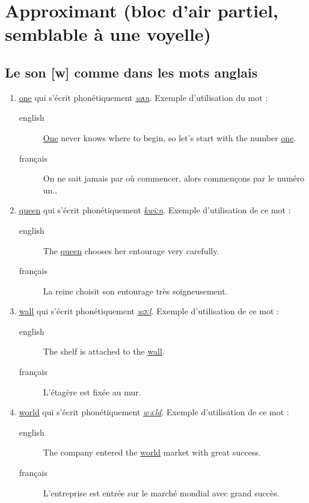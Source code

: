 \section{Approximant (bloc d'air partiel, semblable à une voyelle)}
\label{sec:org222f673}
\subsection{Le son [w] comme dans les mots anglais}
\label{sec:org6303a28}
\begin{enumerate}
\item \href{http://www.wordreference.com/enfr/one}{one} qui s'écrit phonétiquement \href{https://en.oxforddictionaries.com/definition/one}{\emph{wʌn}}. Exemple d'utilisation du
mot : 
\begin{description}
\item[{english}] \textenglish{\href{https://youtu.be/aSNJ00iAZ7I}{One} never knows where to begin, so let's start with
the number \href{https://youtu.be/jHRXlK2SnQ8}{one}.}
\item[{français}] On ne sait jamais par où commencer, alors commençons
par le numéro un..
\end{description}
\item \href{http://www.wordreference.com/enfr/queen}{queen} qui s'écrit phonétiquement \href{https://en.oxforddictionaries.com/definition/queen}{\emph{kwiːn}}. Exemple d'utilisation de
ce mot :
\begin{description}
\item[{english}] \textenglish{The \href{https://youtu.be/Jmd4OLzhQw0}{queen} chooses her entourage very carefully.}
\item[{français}] La reine choisit son entourage très soigneusement.
\end{description}
\item \href{http://www.wordreference.com/enfr/wall}{wall} qui s'écrit phonétiquement \href{https://en.oxforddictionaries.com/definition/wall}{\emph{wɔːl}}. Exemple d'utilisation de ce
mot : 
\begin{description}
\item[{english}] \textenglish{The shelf is attached to the \href{https://youtu.be/BN5Z28Dfl7o}{wall}.}
\item[{français}] L'étagère est fixée au mur.
\end{description}
\item \href{http://www.wordreference.com/enfr/world}{world} qui s'écrit phonétiquement \href{https://en.oxforddictionaries.com/definition/world}{\emph{wəːld}}. Exemple d'utilisation de
ce mot :
\begin{description}
\item[{english}] \textenglish{The company entered the \href{https://youtu.be/fzDft0DZRUw}{world} market with great
success.}
\item[{français}] L'entreprise est entrée sur le marché mondial avec
grand succès.
\end{description}
\end{enumerate}

